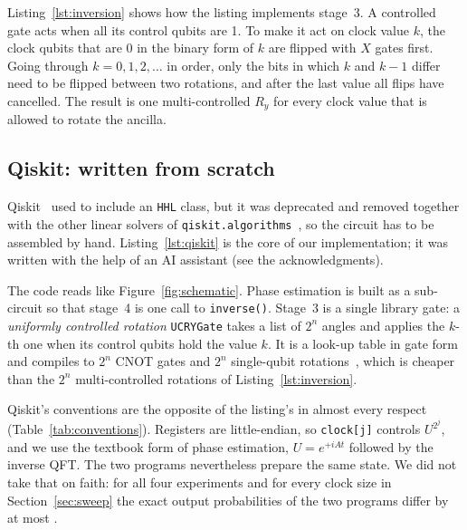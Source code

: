 \documentclass[manuscript,screen,review,nonacm]{acmart}
\newcommand{\code}[1]{\texttt{#1}}
\begin{document}


Listing~\ref{lst:inversion} shows how the listing implements stage~3. A
controlled gate acts when all its control qubits are 1. To make it act on
clock value $k$, the clock qubits that are 0 in the binary form of $k$ are
flipped with $X$ gates first. Going through $k=0,1,2,\dots$ in order, only the
bits in which $k$ and $k-1$ differ need to be flipped between two rotations,
and after the last value all flips have cancelled. The result is one
multi-controlled $R_y$ for every clock value that is allowed to rotate the
ancilla.

\subsection{Qiskit: written from scratch}
\label{sec:qiskit}

Qiskit~\cite{qiskit2024} used to include an \code{HHL} class, but it was
deprecated and removed together with the other linear solvers of
\code{qiskit.algorithms}~\cite{qiskitmigration}, so the circuit has to be
assembled by hand. Listing~\ref{lst:qiskit} is the core of our
implementation; it was written with the help of an AI assistant (see the
acknowledgments).



The code reads like Figure~\ref{fig:schematic}. Phase estimation is built as a
sub-circuit so that stage~4 is one call to \code{inverse()}. Stage~3 is a
single library gate: a \emph{uniformly controlled rotation} \code{UCRYGate}
takes a list of $2^n$ angles and applies the $k$-th one when its control
qubits hold the value $k$. It is a look-up table in gate form and compiles to
$2^n$ CNOT gates and $2^n$ single-qubit rotations~\cite{mottonen2005}, which
is cheaper than the $2^n$ multi-controlled rotations of
Listing~\ref{lst:inversion}.

Qiskit's conventions are the opposite of the listing's in almost every
respect (Table~\ref{tab:conventions}). Registers are little-endian, so
\code{clock[j]} controls $U^{2^j}$, and we use the textbook form of phase
estimation, $U=e^{+iAt}$ followed by the inverse QFT. The two programs
nevertheless prepare the same state. We did not take that on faith: for all
four experiments and for every clock size in Section~\ref{sec:sweep} the exact
output probabilities of the two programs differ by at most
\FrameworkDifference.
\end{document}
